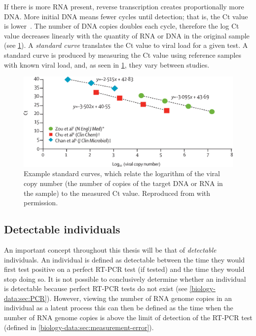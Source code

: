 \documentclass[thesis.tex]{subfiles}
\begin{document}
If there is more RNA present, reverse transcription creates proportionally more DNA.
More initial DNA means fewer cycles until detection; that is, the Ct value is lower~\autocite{hanRTPCR}.
The number of DNA copies doubles each cycle, therefore the log Ct value decreases linearly with the quantity of RNA or DNA in the original sample (see \cref{biology-data:fig:ct-calibration}).
A \emph{standard curve} translates the Ct value to viral load for a given test.
A standard curve is produced by measuring the Ct value using reference samples with known viral load, and, as seen in \cref{biology-data:fig:ct-calibration}, they vary between studies.
\begin{figure}
    \centering
    \includegraphics[width=\textwidth]{biology-data/ct-calibration}
    \caption[Example standard Ct curves]{%
        Example standard curves, which relate the logarithm of the viral copy number (the number of copies of the target DNA or RNA in the sample) to the measured Ct value.
        Reproduced from \textcite{hanRTPCR} with permission.
    }
    \label{biology-data:fig:ct-calibration}
\end{figure}

\subsection{Detectable individuals} \label{biology-data:sec:detectable}

An important concept throughout this thesis will be that of \emph{detectable} individuals.
An individual is defined as detectable between the time they would first test positive on a perfect RT-PCR test (if tested) and the time they would stop doing so.
It is not possible to conclusively determine whether an individual is detectable because perfect RT-PCR tests do not exist (see \cref{biology-data:sec:PCR}).
However, viewing the number of RNA genome copies in an individual as a latent process this can then be defined as the time when the number of RNA genome copies is above the limit of detection of the RT-PCR test (defined in \cref{biology-data:sec:measurement-error}).
\end{document}
